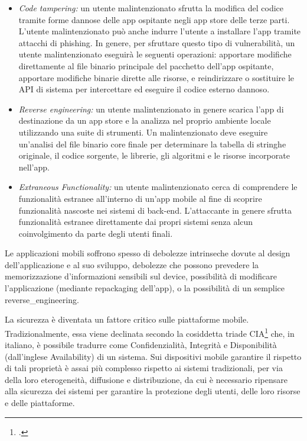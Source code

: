 \begin{itemize}
    \item \textit{Code tampering:}
    un utente malintenzionato sfrutta la modifica del codice tramite forme dannose delle app ospitante negli app store delle terze parti.
    L'utente malintenzionato può anche indurre l'utente a installare l'app tramite attacchi di phishing.
    In genere, per sfruttare questo tipo di vulnerabilità, un utente malintenzionato eseguirà le seguenti operazioni: apportare modifiche direttamente al file binario principale del pacchetto dell’app ospitante, apportare modifiche binarie dirette alle risorse, e reindirizzare o sostituire le API di sistema per intercettare ed eseguire il codice esterno dannoso.

    \item \textit{Reverse engineering:}
    un utente malintenzionato in genere scarica l'app di destinazione da un app store e la analizza nel proprio ambiente locale utilizzando una suite di strumenti.
    Un malintenzionato deve eseguire un'analisi del file binario core finale per determinare la tabella di stringhe originale, il codice sorgente, le librerie, gli algoritmi e le risorse incorporate nell'app.
    \item \textit{Extraneous Functionality:}
    un utente malintenzionato cerca di comprendere le funzionalità estranee all'interno di un'app mobile  al fine di scoprire funzionalità nascoste nei sistemi di back-end.
    L'attaccante in genere sfrutta funzionalità estranee direttamente dai propri sistemi senza alcun coinvolgimento da parte degli utenti finali.
\end{itemize}
Le applicazioni mobili soffrono spesso di debolezze intrinseche dovute al design dell'applicazione e al suo sviluppo, debolezze che possono prevedere la memorizzazione d'informazioni sensibili sul device, possibilità di modificare l'applicazione (mediante \gls{repackaging} dell'app), o la possibilità di un semplice \gls{reverse_engineering}.

La sicurezza è diventata un fattore critico sulle piattaforme mobile.
Tradizionalmente, essa viene declinata secondo la cosiddetta triade CIA\footcite{samonas2014cia} che, in italiano, è possibile tradurre come Confidenzialità, Integrità e Disponibilità (dall’inglese Availability) di un sistema.
Sui dispositivi mobile garantire il rispetto di tali proprietà è assai più complesso rispetto ai sistemi tradizionali, per via della loro eterogeneità, diffusione e distribuzione, da cui è necessario ripensare alla sicurezza dei sistemi per garantire la protezione degli utenti, delle loro risorse e delle piattaforme.

